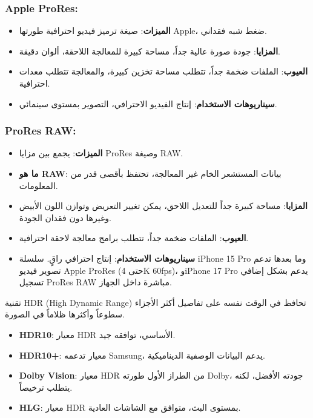 \subsubsection*{Apple ProRes:}

\begin{itemize}
  \item \textbf{الميزات}: صيغة ترميز فيديو احترافية طورتها Apple، ضغط شبه فقداني.
  \item \textbf{المزايا}: جودة صورة عالية جداً، مساحة كبيرة للمعالجة اللاحقة، ألوان دقيقة.
  \item \textbf{العيوب}: الملفات ضخمة جداً، تتطلب مساحة تخزين كبيرة، والمعالجة تتطلب معدات احترافية.
  \item \textbf{سيناريوهات الاستخدام}: إنتاج الفيديو الاحترافي، التصوير بمستوى سينمائي.
\end{itemize}

\subsubsection*{ProRes RAW:}

\begin{itemize}
  \item \textbf{الميزات}: يجمع بين مزايا ProRes وصيغة RAW.
  \item \textbf{ما هو RAW}: بيانات المستشعر الخام غير المعالجة، تحتفظ بأقصى قدر من المعلومات.
  \item \textbf{المزايا}: مساحة كبيرة جداً للتعديل اللاحق، يمكن تغيير التعريض وتوازن اللون الأبيض وغيرها دون فقدان الجودة.
  \item \textbf{العيوب}: الملفات ضخمة جداً، تتطلب برامج معالجة لاحقة احترافية.
  \item \textbf{سيناريوهات الاستخدام}: إنتاج احترافي راقٍ. سلسلة iPhone 15 Pro وما بعدها تدعم تصوير فيديو Apple ProRes (حتى 4K 60fps)، وiPhone 17 Pro يدعم بشكل إضافي تسجيل ProRes RAW مباشرة داخل الجهاز.
\end{itemize}


تقنية HDR (High Dynamic Range) تحافظ في الوقت نفسه على تفاصيل أكثر الأجزاء سطوعاً وأكثرها ظلاماً في الصورة.

\begin{itemize}
  \item \textbf{HDR10}: معيار HDR الأساسي، توافقه جيد.
  \item \textbf{HDR10+}: معيار تدعمه Samsung، يدعم البيانات الوصفية الديناميكية.
  \item \textbf{Dolby Vision}: معيار HDR من الطراز الأول طورته Dolby، جودته الأفضل، لكنه يتطلب ترخيصاً.
  \item \textbf{HLG}: معيار HDR بمستوى البث، متوافق مع الشاشات العادية.
\end{itemize}

